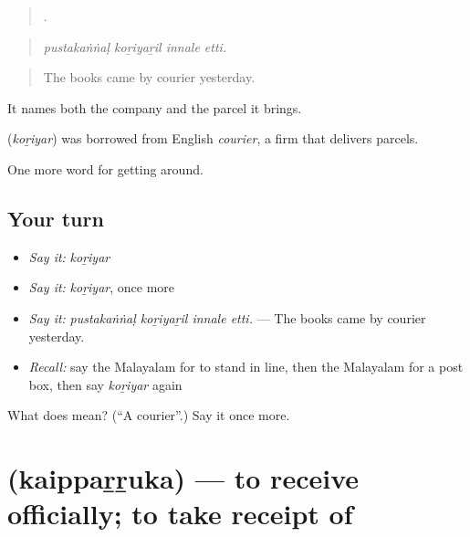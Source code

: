 \begin{quote}
   .
\end{quote}

\begin{quote}
\emph{pustakaṅṅaḷ koṟiyaṟil innale etti.}
\end{quote}

\begin{quote}
The books came by courier yesterday.
\end{quote}

It names both the company and the parcel it brings.

\begin{cousinweb}
\textbf{} (\emph{koṟiyar}) was borrowed from English \emph{courier}, a firm that delivers parcels.
\end{cousinweb}

\begin{grammarlens}[title={What you've built}]
One more word for getting around.
\end{grammarlens}

\subsection*{Your turn}
\begin{itemize}
\raggedright
  \item \emph{Say it:} \emph{koṟiyar}
  \item \emph{Say it:} \emph{koṟiyar}, once more
  \item \emph{Say it:} \emph{pustakaṅṅaḷ koṟiyaṟil innale etti.} — The books came by courier yesterday.
  \item \emph{Recall:} say the Malayalam for to stand in line, then the Malayalam for a post box, then say \emph{koṟiyar} again
\end{itemize}

\begin{tcolorbox}[breakable,colback=teal!4,colframe=teal!35!black,title={Before you move on}]
What does  mean? (\textquotedblleft{}A courier\textquotedblright{}.) Say it once more.
\end{tcolorbox}
\section[\texorpdfstring{\ml{കൈപ്പറ്റുക} (kaippaṟṟuka)}{കൈപ്പറ്റുക (kaippaṟṟuka)}]{ (kaippaṟṟuka) — to receive officially; to take receipt of}

